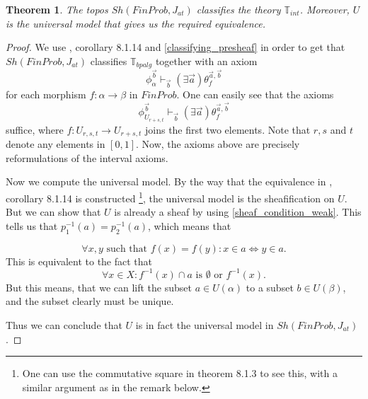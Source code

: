 \documentclass[a4paper]{amsproc}
\theoremstyle{plain}
\newtheorem{theorem}{Theorem}[section]
\theoremstyle{definition}
\theoremstyle{remark}
\numberwithin{equation}{section}
\begin{document}
\begin{theorem} \label{classifying}
The topos $Sh(FinProb,J_{at})$ classifies the theory $\mathbb{T}_{int}$. Moreover, $U$ is the universal model that gives us the required equivalence.
\end{theorem}
\begin{proof}
We use \cite{caramello_book}, corollary 8.1.14 and \ref{classifying_presheaf} in order to get that $Sh(FinProb,J_{at})$ classifies $\mathbb{T}_{bpalg}$ together with an axiom
\[
\phi_{\alpha}^{\vec{b}} \vdash_{\vec{b}} (\exists \vec{a}) \theta_f^{\vec{a},\vec{b}}
\]
for each morphism $f: \alpha \to \beta$ in $FinProb$. One can easily see that the axioms
\[
\phi_{U_{r+s,t}}^{\vec{b}} \vdash_{\vec{b}} (\exists \vec{a}) \theta_f^{\vec{a},\vec{b}}
\]
suffice, where $f: U_{r,s,t} \to U_{r+s,t}$ joins the first two elements. Note that $r,s$ and $t$ denote any elements in $[0,1]$. Now, the axioms above are precisely reformulations of the interval axioms.

Now we compute the universal model. By the way that the equivalence in \cite{caramello_book}, corollary 8.1.14 is constructed \footnote{One can use the commutative square in theorem 8.1.3 to see this, with a similar argument as in the remark below.}, the universal model is the sheafification on $U$. But we can show that $U$ is already a sheaf by using \ref{sheaf_condition_weak}. This tells us that $p_1^{-1}(a) = p_2^{-1}(a)$, which means that

\[
\forall x,y \text{ such that } f(x) = f(y): x \in a \Leftrightarrow y \in a .
\]
This is equivalent to the fact that
\[
\forall x \in X: f^{-1}(x) \cap a \text{ is } \emptyset \text{ or } f^{-1}(x) .
\]
But this means, that we can lift the subset $a \in U(\alpha)$ to a subset $b \in U(\beta)$, and the subset clearly must be unique.

Thus we can conclude that $U$ is in fact the universal model in $Sh(FinProb, J_{at})$.
\end{proof}
\end{document}
